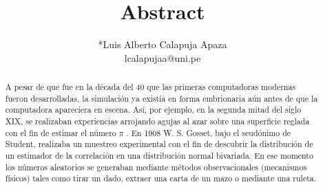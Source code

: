 \documentclass[10pt,a4paper]{article}
\author{{*}Luis Alberto Calapuja Apaza \\lcalapujaa$@$uni.pe}
\title{Abstract}
\begin{document}
\maketitle
\begin{abstract}
A pesar de que fue en la década del 40 que las primeras computadoras modernas fueron
desarrolladas,  la  simulación  ya  existía  en  forma  embrionaria  aún  antes  de  que  la
computadora apareciera en escena. Así, por ejemplo, en la segunda mitad del siglo XIX,
se realizaban experiencias arrojando agujas al azar sobre una superficie reglada con el fin
de estimar el número 
$\pi$
.  En  1908  W.  S.  Gosset,  bajo  el  seudónimo  de  Student,  realizaba
un  muestreo  experimental  con  el  fin  de  descubrir  la  distribución  de  un  estimador  de  la
correlación en una distribución normal bivariada. En ese momento los números aleatorios
se  generaban  mediante  métodos  observacionales  (mecanismos  físicos)  tales  como  tirar
un dado, extraer una carta de un mazo o mediante una ruleta.
\end{abstract}
\end{document}
